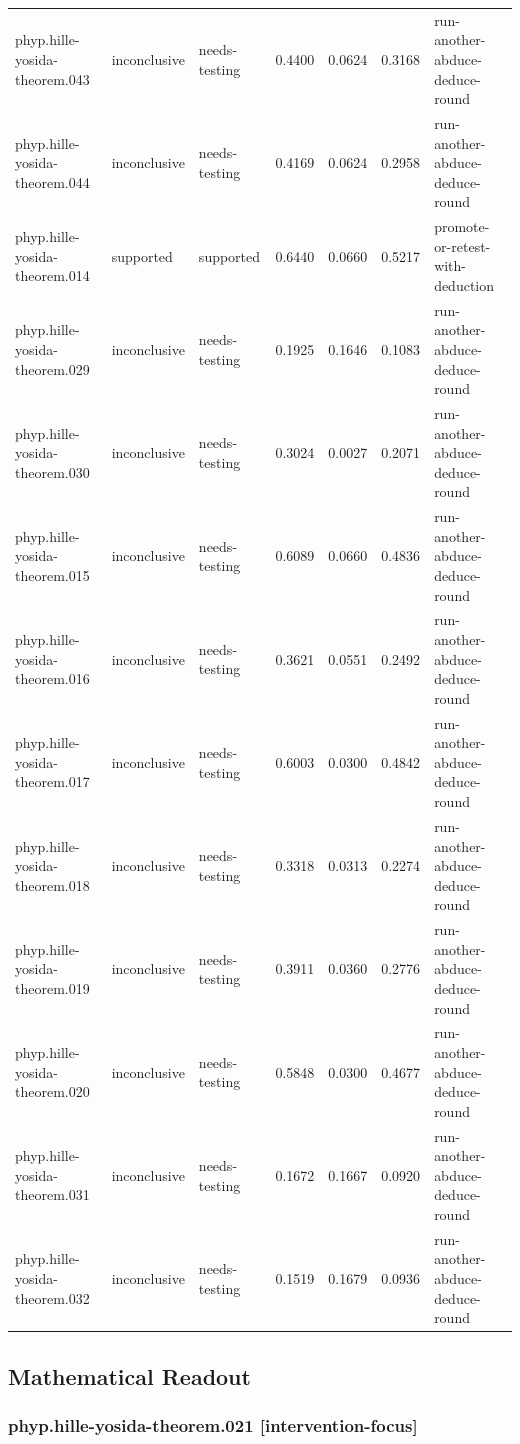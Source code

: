 \documentclass[
]{article}
\begin{document}
{\begin{longtable}[]{@{}lllllll@{}}
phyp.hille-yosida-theorem.043 & inconclusive & needs-testing & 0.4400 &
0.0624 & 0.3168 & run-another-abduce-deduce-round \\
phyp.hille-yosida-theorem.044 & inconclusive & needs-testing & 0.4169 &
0.0624 & 0.2958 & run-another-abduce-deduce-round \\
phyp.hille-yosida-theorem.014 & supported & supported & 0.6440 & 0.0660
& 0.5217 & promote-or-retest-with-deduction \\
phyp.hille-yosida-theorem.029 & inconclusive & needs-testing & 0.1925 &
0.1646 & 0.1083 & run-another-abduce-deduce-round \\
phyp.hille-yosida-theorem.030 & inconclusive & needs-testing & 0.3024 &
0.0027 & 0.2071 & run-another-abduce-deduce-round \\
phyp.hille-yosida-theorem.015 & inconclusive & needs-testing & 0.6089 &
0.0660 & 0.4836 & run-another-abduce-deduce-round \\
phyp.hille-yosida-theorem.016 & inconclusive & needs-testing & 0.3621 &
0.0551 & 0.2492 & run-another-abduce-deduce-round \\
phyp.hille-yosida-theorem.017 & inconclusive & needs-testing & 0.6003 &
0.0300 & 0.4842 & run-another-abduce-deduce-round \\
phyp.hille-yosida-theorem.018 & inconclusive & needs-testing & 0.3318 &
0.0313 & 0.2274 & run-another-abduce-deduce-round \\
phyp.hille-yosida-theorem.019 & inconclusive & needs-testing & 0.3911 &
0.0360 & 0.2776 & run-another-abduce-deduce-round \\
phyp.hille-yosida-theorem.020 & inconclusive & needs-testing & 0.5848 &
0.0300 & 0.4677 & run-another-abduce-deduce-round \\
phyp.hille-yosida-theorem.031 & inconclusive & needs-testing & 0.1672 &
0.1667 & 0.0920 & run-another-abduce-deduce-round \\
phyp.hille-yosida-theorem.032 & inconclusive & needs-testing & 0.1519 &
0.1679 & 0.0936 & run-another-abduce-deduce-round \\
\end{longtable}
}

\subsection{Mathematical Readout}\label{mathematical-readout}

\subsubsection{phyp.hille-yosida-theorem.021
{[}intervention-focus{]}}\label{phyphille-yosida-theorem021-intervention-focus}
\end{document}
